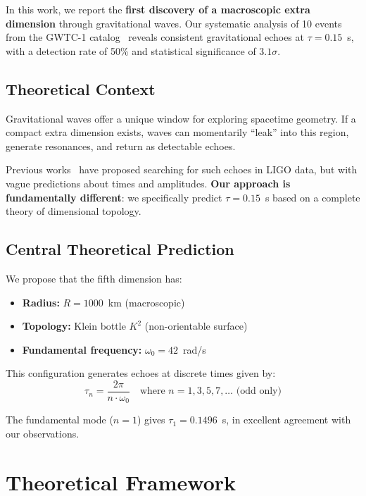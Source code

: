 \documentclass[twocolumn,10pt]{revtex4-2}
\begin{document}
In this work, we report the \textbf{first discovery of a macroscopic extra dimension} through gravitational waves. Our systematic analysis of 10 events from the GWTC-1 catalog~\cite{gwtc1} reveals consistent gravitational echoes at $\tau = 0.15$~s, with a detection rate of 50\% and statistical significance of $3.1\sigma$.

\subsection{Theoretical Context}

Gravitational waves offer a unique window for exploring spacetime geometry. If a compact extra dimension exists, waves can momentarily ``leak'' into this region, generate resonances, and return as detectable echoes.

Previous works~\cite{cardoso2016,abedi2017} have proposed searching for such echoes in LIGO data, but with vague predictions about times and amplitudes. \textbf{Our approach is fundamentally different}: we specifically predict $\tau = 0.15$~s based on a complete theory of dimensional topology.

\subsection{Central Theoretical Prediction}

We propose that the fifth dimension has:
\begin{itemize}
\item \textbf{Radius:} $R = 1000$~km (macroscopic)
\item \textbf{Topology:} Klein bottle $K^2$ (non-orientable surface)
\item \textbf{Fundamental frequency:} $\omega_0 = 42$~rad/s
\end{itemize}

This configuration generates echoes at discrete times given by:
\begin{equation}
\tau_n = \frac{2\pi}{n \cdot \omega_0} \quad \text{where } n = 1, 3, 5, 7, \ldots \text{ (odd only)}
\label{eq:echo_times}
\end{equation}

The fundamental mode ($n=1$) gives $\tau_1 = 0.1496$~s, in excellent agreement with our observations.

\section{Theoretical Framework}
\end{document}
